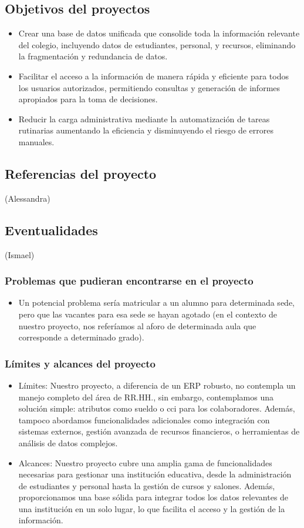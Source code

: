 \subsection{Objetivos del proyectos}
\begin{itemize}
	\item Crear una base de datos unificada que consolide toda la información relevante del colegio, incluyendo datos de estudiantes, personal, y recursos, eliminando la fragmentación y redundancia de datos.
	\item Facilitar el acceso a la información de manera rápida y eficiente para todos los usuarios autorizados, permitiendo consultas y generación de informes apropiados para la toma de decisiones.
	\item Reducir la carga administrativa mediante la automatización de tareas rutinarias aumentando la eficiencia y disminuyendo el riesgo de errores manuales.
\end{itemize}
\subsection{Referencias del proyecto} (Alessandra)
\subsection{Eventualidades} (Ismael)
\subsubsection{Problemas que pudieran encontrarse en el proyecto}
\begin{itemize}
	\item Un potencial problema sería matricular a un alumno para determinada sede, pero que las vacantes para esa sede se hayan agotado (en el contexto de nuestro proyecto, nos referíamos al aforo de determinada aula que corresponde a determinado grado).
\end{itemize}
\subsubsection{Límites y alcances del proyecto}
\begin{itemize}
	\item Límites: Nuestro proyecto, a diferencia de un ERP robusto, no contempla un manejo completo del área de RR.HH., sin embargo, contemplamos una solución simple: atributos como sueldo o cci para los colaboradores. Además, tampoco abordamos funcionalidades adicionales como integración con sistemas externos, gestión avanzada de recursos financieros, o herramientas de análisis de datos complejos.
	\item Alcances: Nuestro proyecto cubre una amplia gama de funcionalidades necesarias para gestionar una institución educativa, desde la administración de estudiantes y personal hasta la gestión de cursos y salones. Además, proporcionamos una base sólida para integrar todos los datos relevantes de una institución en un solo lugar, lo que facilita el acceso y la gestión de la información.
\end{itemize}